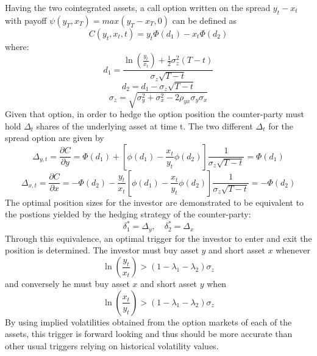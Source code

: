 Having the two cointegrated assets, a call option written on the spread $y_t - x_t$ with payoff $\psi(y_T, x_T)=max(y_T-x_T,0)$ can be defined as 
\begin{equation}
    C(y_t,x_t,t)=y_t \Phi(d_1)-x_t \Phi(d_2)
    \label{spread_option}
\end{equation}
where:
\begin{equation}
    \label{e:calc-d1}
    d_1=\frac{\ln\left(\frac{y_t}{x_t}\right)+\frac{1}{2}\sigma^2_z(T-t)}{\sigma_z \sqrt{T-t}}
\end{equation}
\begin{equation}
    d_2=d_1-\sigma_z \sqrt{T-t}
\end{equation}
\begin{equation}
    \sigma_z=\sqrt{\sigma_y^2+ \sigma_x^2-2\rho_{yx}\sigma_y\sigma_x}
\end{equation}
Given that option, in order to hedge the option position the counter-party must hold $\Delta_t$ shares of the underlying asset at time t. The two different $\Delta_t$ for the spread option are given by 
\begin{equation}
    \label{e:position-size-model-1}
    \Delta_{y,t} = \frac{\partial C}{\partial y} = \Phi(d_1)+\left[\phi(d_1)-\frac{x_t}{y_t}\phi(d_2)\right] \frac{1}{\sigma_z \sqrt{T-t}}=\Phi(d_1)
\end{equation}
\begin{equation}
    \label{e:position-size-model-2}
    \Delta_{x,t} = \frac{\partial C}{\partial x} = -\Phi(d_2)-\frac{y_t}{x_t}\left[\phi(d_1)-\frac{x_t}{y_t}\phi(d_2)\right] \frac{1}{\sigma_z \sqrt{T-t}}=-\Phi(d_2)
\end{equation}
The optimal position sizes for the investor are demonstrated to be equivalent to the postions yielded by the hedging strategy of the counter-party:
\begin{equation}
    \label{e:position-sizes}
    \delta^*_1=\Delta_y,\quad \delta^*_2=\Delta_x
\end{equation}
Through this equivalence, an optimal trigger for the investor to  enter and exit the position is determined. The investor must buy asset $y$ and short asset $x$ whenever 
\begin{equation}
    \label{e:trigger-1}
    \ln\left(\frac{y_t}{x_t}\right) > (1-\lambda_1 - \lambda_2)\sigma_z
\end{equation}
and conversely he must buy asset $x$ and short asset $y$ when
\begin{equation}
    \ln\left(\frac{x_t}{y_t}\right) > (1-\lambda_1 - \lambda_2)\sigma_z
\end{equation}
By using implied volatilities obtained from the option markets of each of the assets, this trigger is forward looking and thus should be more accurate than other usual triggers relying on historical volatility values. 

